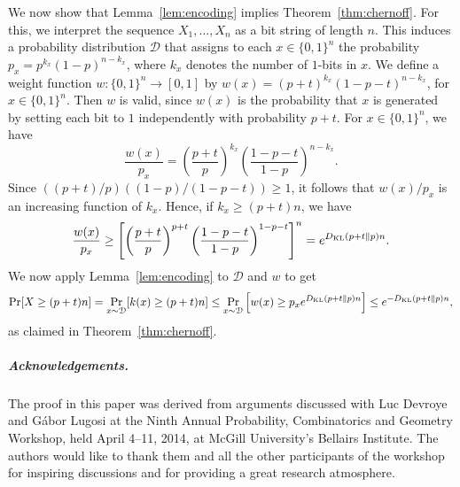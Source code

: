 \documentclass[a4paper,english,numberwithinsect]{oasics-v2016}
\newcommand{\DKL}{D_\textup{KL}}
\begin{document}
We now show that Lemma~\ref{lem:encoding} 
implies Theorem~\ref{thm:chernoff}. 
For this, we interpret the sequence $X_1, \dots, X_n$
as a bit string of length $n$. This induces a probability distribution 
$\mathcal{D}$ that assigns to each $x \in \{0, 1\}^n$ the 
probability 
$p_x = p^{k_x} (1-p)^{n-k_x}$, where $k_x$ denotes the number of
$1$-bits in $x$.
We define a weight function $w : \{0,1\}^n \rightarrow [0,1]$ by
$w(x) = (p+t)^{k_x}(1-p-t)^{n-k_x}$, for 
$x \in \{0,1\}^n$.
Then $w$ is valid, since $w(x)$ is the
probability that $x$ is generated by setting each bit 
to $1$ independently with probability $p+t$.
For $x \in \{0,1\}^n$, 
we have
\[
\frac{w(x)}{p_x}
=
\left(\frac{p+t}{p}\right)^{k_x}
\left(\frac{1-p-t}{1-p}\right)^{n - k_x}. 
\]
Since $((p+t)/p)((1-p)/(1-p-t)) \geq 1$, it follows
that $w(x)/p_x$ is an increasing function of $k_x$.
Hence, if $k_x \geq (p + t)n$, we have
\[
\frac{w(x)}{p_x}
\geq
\left[\left(\frac{p+t}{p}\right)^{p+t}
\left(\frac{1-p-t}{1-p}\right)^{1 - p-t}\right]^n
= e^{\DKL(p+t \| p)n}.
\]
We now apply Lemma~\ref{lem:encoding} to $\mathcal{D}$ and $w$ to get
\[
\Pr[X \geq (p+t)n] = \Pr_{x\sim \mathcal{D}} [ k(x) \geq (p+t)n]
\leq \Pr_{x \sim \mathcal{D}} \left[ w(x) \geq 
p_xe^{\DKL(p+t \| p)n}\right]
    \leq e^{-\DKL(p+t \| p)n},
\]
as claimed in Theorem~\ref{thm:chernoff}.

\subparagraph*{Acknowledgements.}
The proof in this paper was derived 
from arguments discussed with Luc Devroye and
G\'abor Lugosi at the
Ninth Annual Probability, Combinatorics
and Geometry Workshop, held April 4--11, 2014, at McGill University's
Bellairs Institute. The authors would like to thank them and
all the other participants of the workshop for inspiring discussions
and for providing a great research atmosphere.





\end{document}
